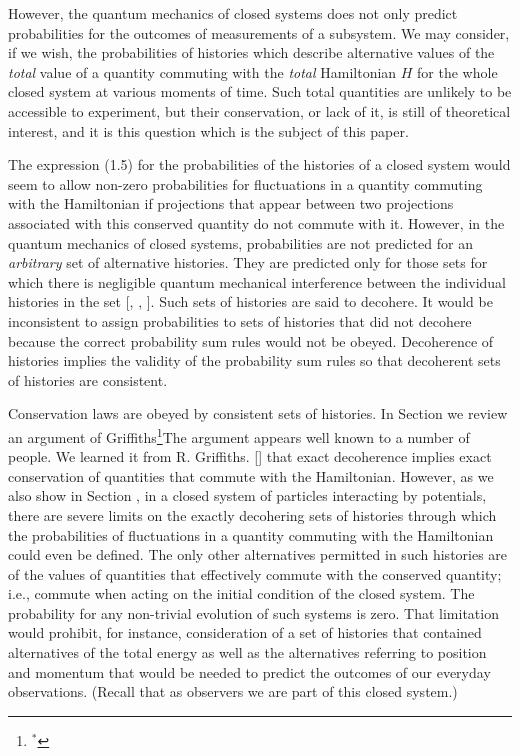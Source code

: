 However, the quantum mechanics of closed systems does not only predict
probabilities for the outcomes of measurements of a subsystem.  We may
consider, if we wish, the probabilities of histories which describe
alternative values of the {\it total} value of a quantity commuting with
the {\it total} Hamiltonian $H$ for
the whole closed system at various moments of time.  Such total quantities
are unlikely to be accessible to experiment, but their conservation, or
lack of it, is still of theoretical interest, and it is this question which
is the subject of this paper.

The expression (1.5) for the probabilities of the histories of a closed system
would seem to allow non-zero probabilities for fluctuations
in a quantity commuting with the Hamiltonian if projections
that appear between
two projections associated with this conserved quantity
do not commute with it. However, in the
quantum mechanics of closed systems, probabilities are not predicted for
an {\it arbitrary} set of alternative histories.  They are predicted
only for those sets for which there
is negligible quantum mechanical interference between the individual
histories in the set [\Gria, \Omn , \GMH].   Such sets of histories
are said to decohere.
It would be inconsistent to assign probabilities to
sets of histories that did not decohere because
the correct probability sum rules would
not be obeyed.  Decoherence of histories implies the validity of the
probability sum rules so that decoherent sets of histories are consistent.

Conservation laws are obeyed by consistent sets of histories. In Section
\uppercase\expandafter{}
we review an argument of Griffiths\footnote{$^{*}$}{The argument appears well
known to a number of people.  We learned it from R. Griffiths.} [\Grib]
that exact decoherence implies exact conservation of quantities that commute
with the Hamiltonian.
However, as we also show in Section
\uppercase\expandafter{},
in a closed system of particles interacting by potentials, there are
severe limits on the exactly decohering sets of histories through
which the probabilities of fluctuations in a quantity commuting with the
Hamiltonian
could even be defined.  The only other alternatives
permitted in such histories are of the values of quantities that
effectively commute with the conserved quantity; i.e., commute when
acting on the initial condition of the closed system.  The probability
for any non-trivial evolution of such systems is zero.  That limitation
would
prohibit, for instance, consideration of a set of histories that
contained alternatives of the total energy as well as the alternatives
referring to position and momentum that would be needed to predict the
outcomes of our everyday observations.  (Recall that as observers we
are part of this closed system.)

